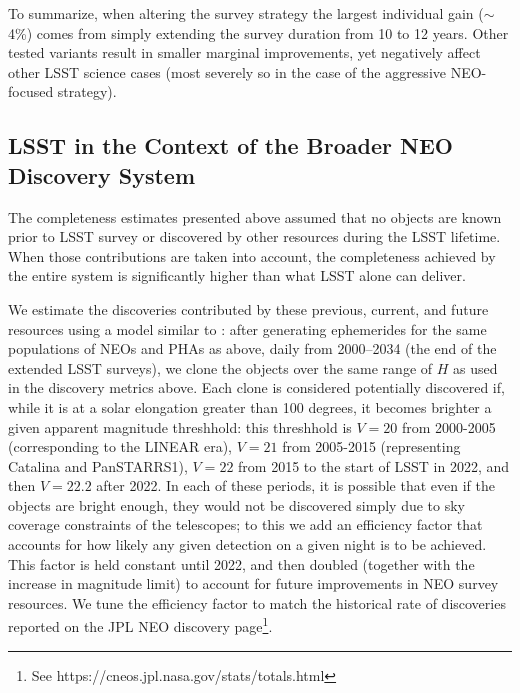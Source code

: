 To summarize, when altering the survey strategy the largest individual gain ($\sim$4\%) comes from simply extending the survey duration from 10 to 12 years. Other tested variants result in smaller marginal improvements, yet negatively affect other LSST science cases (most severely so in the case of the aggressive NEO-focused strategy).

\subsection{LSST in the Context of the Broader NEO Discovery System\label{sec:known}}

The completeness estimates presented above assumed that no objects are known prior to LSST survey or 
discovered by other resources during the LSST lifetime. When those contributions are taken into account, the completeness achieved by the entire system is significantly higher than what LSST alone can deliver.


We estimate the discoveries contributed by these previous, current, and future resources 
using a model similar to \citet{VeresChesley2017neo}: 
after generating ephemerides for the same populations of NEOs and PHAs as above, daily from 2000--2034 
(the end of the extended LSST surveys), we clone the objects over the same range of $H$ as 
used in the discovery metrics above. Each clone is considered potentially discovered if, while it is at
a solar elongation greater than 100 degrees, it becomes brighter a given apparent magnitude threshhold: 
this threshhold is $V=20$ from 2000-2005 (corresponding to the LINEAR era), $V=21$ from 2005-2015 
(representing Catalina and PanSTARRS1), $V=22$ from 2015 to the start of LSST in 2022, and then
$V=22.2$ after 2022.  In each of these periods, it is possible that even if the objects are bright enough, 
they would not be discovered simply due to sky coverage constraints of the telescopes; to 
this we add an efficiency factor that accounts for how likely any given detection on a given night is to be achieved. 
This factor is held constant until 2022, and then doubled (together with the increase in magnitude 
limit) to account for future improvements in NEO survey resources. We tune the efficiency factor to match
the historical rate of discoveries reported on the JPL NEO discovery page\footnote{See https://cneos.jpl.nasa.gov/stats/totals.html}.

